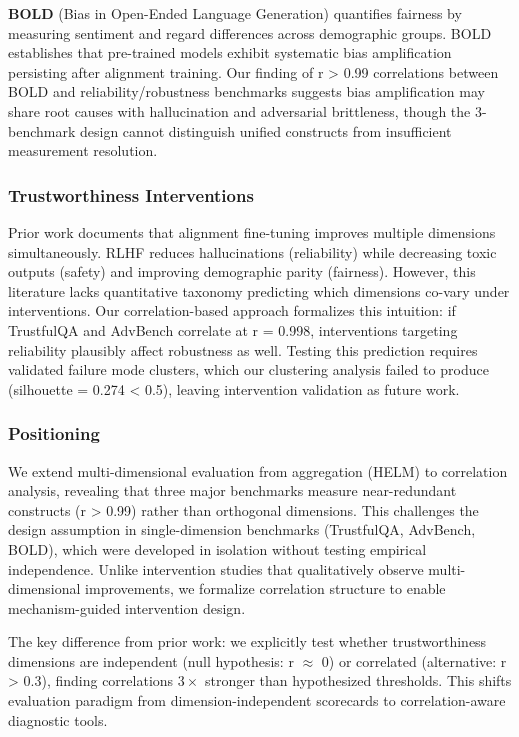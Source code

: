 \textbf{BOLD} (Bias in Open-Ended Language Generation) quantifies fairness by measuring sentiment and regard differences across demographic groups. BOLD establishes that pre-trained models exhibit systematic bias amplification persisting after alignment training. Our finding of r > 0.99 correlations between BOLD and reliability/robustness benchmarks suggests bias amplification may share root causes with hallucination and adversarial brittleness, though the 3-benchmark design cannot distinguish unified constructs from insufficient measurement resolution.

\subsubsection{Trustworthiness Interventions}

Prior work documents that alignment fine-tuning improves multiple dimensions simultaneously. RLHF reduces hallucinations (reliability) while decreasing toxic outputs (safety) and improving demographic parity (fairness). However, this literature lacks quantitative taxonomy predicting which dimensions co-vary under interventions. Our correlation-based approach formalizes this intuition: if TrustfulQA and AdvBench correlate at r = 0.998, interventions targeting reliability plausibly affect robustness as well. Testing this prediction requires validated failure mode clusters, which our clustering analysis failed to produce (silhouette = 0.274 < 0.5), leaving intervention validation as future work.

\subsubsection{Positioning}

We extend multi-dimensional evaluation from aggregation (HELM) to correlation analysis, revealing that three major benchmarks measure near-redundant constructs (r > 0.99) rather than orthogonal dimensions. This challenges the design assumption in single-dimension benchmarks (TrustfulQA, AdvBench, BOLD), which were developed in isolation without testing empirical independence. Unlike intervention studies that qualitatively observe multi-dimensional improvements, we formalize correlation structure to enable mechanism-guided intervention design.

The key difference from prior work: we explicitly test whether trustworthiness dimensions are independent (null hypothesis: r $\approx$ 0) or correlated (alternative: r > 0.3), finding correlations $3\times$ stronger than hypothesized thresholds. This shifts evaluation paradigm from dimension-independent scorecards to correlation-aware diagnostic tools.
